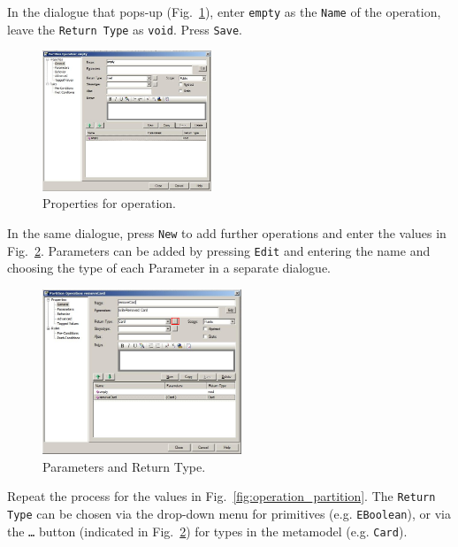 In the dialogue that pops-up (Fig.~\ref{fig:operation_properties}), enter
\texttt{empty} as the \texttt{Name} of the operation, leave the \texttt{Return
Type} as \texttt{void}.  Press \texttt{Save}.
 
\begin{figure}[htbp]
	\centering
  \includegraphics[width=0.45\textwidth]{pics/memBoxBilder/memBox37.png}
	\caption{Properties for operation.}
	\label{fig:operation_properties}
\end{figure}

In the same dialogue, press \texttt{New} to add further operations and enter the
values in Fig.~\ref{fig:operation_parameters}.  Parameters can be added by
pressing \texttt{Edit} and entering the name and choosing the type of each
Parameter in a separate dialogue.

\begin{figure}[htbp]
	\centering
  \includegraphics[width=0.53\textwidth]{pics/memBoxBilder/memBox38.png}
	\caption{Parameters and Return Type.}
	\label{fig:operation_parameters} 
\end{figure}

Repeat the process for the values in Fig.~\ref{fig:operation_partition}.  The
\texttt{Return Type} can be chosen via the drop-down menu for primitives
(e.g. \texttt{EBoolean}), or via the \texttt{\ldots} button (indicated in
Fig.~\ref{fig:operation_parameters}) for types in the metamodel
(e.g. \texttt{Card}).

